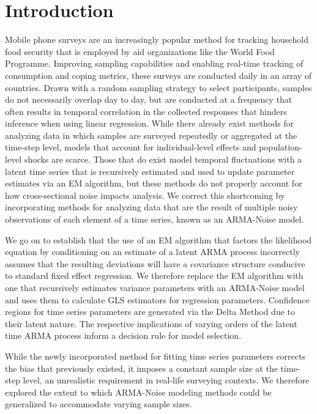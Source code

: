 \section{Introduction}
\pagestyle{headings}

Mobile phone surveys are an increasingly popular method for tracking household food security that is employed by aid organizations like the World Food Programme. Improving sampling capabilities and enabling real-time tracking of consumption and coping metrics, these surveys are conducted daily in an array of countries. Drawn with a random sampling strategy to select participants, samples do not necessarily overlap day to day, but are conducted at a frequency that often results in temporal correlation in the collected responses that hinders inference when using linear regression. While there already exist methods for analyzing data in which samples are surveyed repeatedly or aggregated at the time-step level, models that account for individual-level effects and population-level shocks are scarce. Those that do exist model temporal fluctuations with a latent time series that is recursively estimated and used to update parameter estimates via an EM algorithm, but these methods do not properly account for how cross-sectional noise impacts analysis. We correct this shortcoming by incorporating methods for analyzing data that are the result of multiple noisy observations of each element of a time series, known as an ARMA-Noise model. 

We go on to establish that the use of an EM algorithm that factors the likelihood equation by conditioning on an estimate of a latent ARMA process incorrectly assumes that the resulting deviations will have a covariance structure conducive to standard fixed effect regression. We therefore replace the EM algorithm with one that recursively estimates variance parameters with an ARMA-Noise model and uses them to calculate GLS estimators for regression parameters. Confidence regions for time series parameters are generated via the Delta Method due to their latent nature. The respective implications of varying orders of the latent time ARMA process inform a decision rule for model selection.

While the newly incorporated method for fitting time series parameters corrects the bias that previously existed, it imposes a constant sample size at the time-step level, an unrealistic requirement in real-life surveying contexts. We therefore explored the extent to which ARMA-Noise modeling methods could be generalized to accommodate varying sample sizes. 


